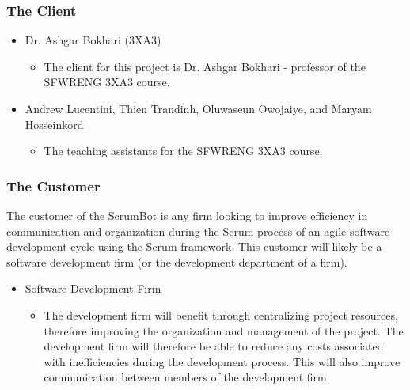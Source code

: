\documentclass[12pt, titlepage]{article}
\begin{document}
\subsubsection{The Client}
\begin{itemize}
    \item Dr. Ashgar Bokhari (3XA3)
    \begin{itemize}
      \item[] The client for this project is Dr. Ashgar Bokhari - professor of the SFWRENG 3XA3 course.
    \end{itemize}
    
    \color{red}
    \item Andrew Lucentini, Thien Trandinh, Oluwaseun Owojaiye, and Maryam Hosseinkord
    \begin{itemize}
        \item[] The teaching assistants for the SFWRENG 3XA3 course.
    \end{itemize}
\end{itemize}

\subsubsection{The Customer}
The customer of the ScrumBot is any firm looking to improve efficiency in communication and organization during the Scrum process of an agile software development cycle using the Scrum framework. This customer will likely be a software development firm (or the development department of a firm).

\begin{itemize}
    \item Software Development Firm
    \begin{itemize}
      \item[] The development firm will benefit through centralizing project resources, therefore improving the organization and management of the project. The development firm will therefore be able to reduce any costs associated with inefficiencies during the development process. This will also improve communication between members of the development firm.
    \end{itemize}
\end{itemize}
\end{document}
